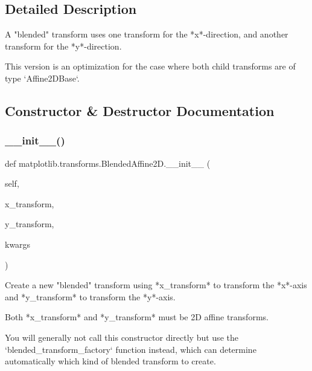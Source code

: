 \subsection{Detailed Description}
\begin{DoxyVerb}A "blended" transform uses one transform for the *x*-direction, and
another transform for the *y*-direction.

This version is an optimization for the case where both child
transforms are of type `Affine2DBase`.
\end{DoxyVerb}
 

\subsection{Constructor \& Destructor Documentation}
\mbox{\label{classmatplotlib_1_1transforms_1_1BlendedAffine2D_aed2da8d23d9c632cd576d17618b8c296}} 
\subsubsection{\texorpdfstring{\+\_\+\+\_\+init\+\_\+\+\_\+()}{\_\_init\_\_()}}
{\footnotesize\ttfamily def matplotlib.\+transforms.\+Blended\+Affine2\+D.\+\_\+\+\_\+init\+\_\+\+\_\+ (\begin{DoxyParamCaption}\item[{}]{self,  }\item[{}]{x\+\_\+transform,  }\item[{}]{y\+\_\+transform,  }\item[{}]{kwargs }\end{DoxyParamCaption})}

\begin{DoxyVerb}Create a new "blended" transform using *x_transform* to transform the
*x*-axis and *y_transform* to transform the *y*-axis.

Both *x_transform* and *y_transform* must be 2D affine transforms.

You will generally not call this constructor directly but use the
`blended_transform_factory` function instead, which can determine
automatically which kind of blended transform to create.
\end{DoxyVerb}
 

